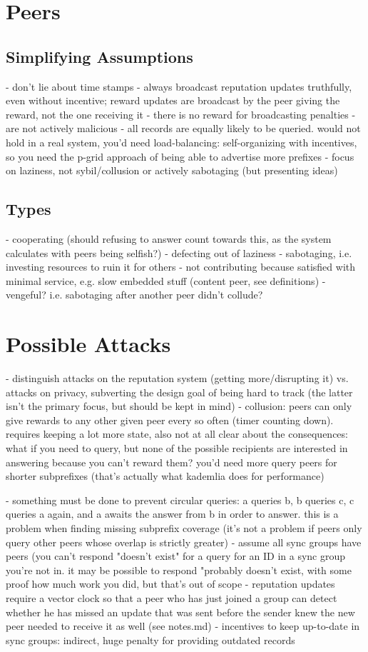 \section{Peers}
\subsection{Simplifying Assumptions}
- don't lie about time stamps
- always broadcast reputation updates truthfully, even without incentive; reward
  updates are broadcast by the peer giving the reward, not the one receiving it
- there is no reward for broadcasting penalties
- are not actively malicious
- all records are equally likely to be queried. would not hold in a real system,
  you'd need load-balancing: self-organizing with incentives, so you need the
  p-grid approach of being able to advertise more prefixes
- focus on laziness, not sybil/collusion or actively sabotaging (but presenting
  ideas)
\subsection{Types}
- cooperating (should refusing to answer count towards this, as the system
  calculates with peers being selfish?)
- defecting out of laziness
- sabotaging, i.e. investing resources to ruin it for others
- not contributing because satisfied with minimal service, e.g. slow embedded
  stuff (content peer, see definitions)
- vengeful? i.e. sabotaging after another peer didn't collude?

\section{Possible Attacks}
- distinguish attacks on the reputation system (getting more/disrupting it) vs.
  attacks on privacy, subverting the design goal of being hard to track (the
  latter isn't the primary focus, but should be kept in mind)
- collusion: peers can only give rewards to any other given peer every so often
  (timer counting down). requires keeping a lot more state, also not at all
  clear about the consequences: what if you need to query, but none of the
  possible recipients are interested in answering because you can't reward them?
  you'd need more query peers for shorter subprefixes (that's actually what
  kademlia does for performance)


- something must be done to prevent circular queries: a queries b, b queries c,
  c queries a again, and a awaits the answer from b in order to answer. this is
  a problem when finding missing subprefix coverage (it's not a problem if peers
  only query other peers whose overlap is strictly greater)
- assume all sync groups have peers (you can't respond "doesn't exist" for a
  query for an ID in a sync group you're not in. it may be possible to respond
  "probably doesn't exist, with some proof how much work you did, but that's out
  of scope
- reputation updates require a vector clock so that a peer who has just joined a
  group can detect whether he has missed an update that was sent before the
  sender knew the new peer needed to receive it as well (see notes.md)
- incentives to keep up-to-date in sync groups: indirect, huge penalty for
  providing outdated records
